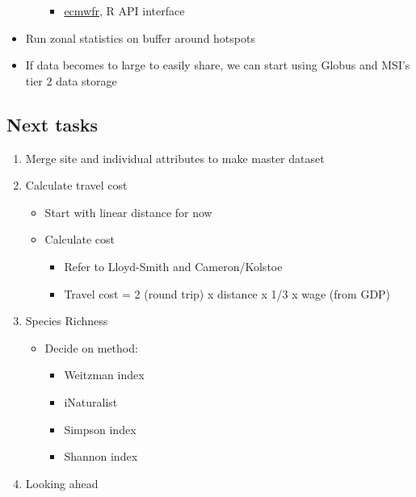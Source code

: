 \documentclass[
  letterpaper,
]{article}
\providecommand{\tightlist}{%
  \setlength{\itemsep}{0pt}\setlength{\parskip}{0pt}}\usepackage{longtable,booktabs,array}
\begin{document}
\begin{tcolorbox}
\begin{itemize}
\begin{itemize}
    \begin{itemize}
    \tightlist
    \item
      \href{https://bluegreen-labs.github.io/ecmwfr/}{ecmwfr}, R API
      interface
    \end{itemize}
  \end{itemize}
\item
  Run zonal statistics on buffer around hotspots
\item
  If data becomes to large to easily share, we can start using Globus
  and MSI's tier 2 data storage
\end{itemize}

\subsection{Next tasks}\label{next-tasks}

\begin{enumerate}
\def\labelenumi{\arabic{enumi}.}
\tightlist
\item
  Merge site and individual attributes to make master dataset
\item
  Calculate travel cost

  \begin{itemize}
  \tightlist
  \item
    Start with linear distance for now
  \item
    Calculate cost

    \begin{itemize}
    \tightlist
    \item
      Refer to Lloyd-Smith and Cameron/Kolstoe
    \item
      Travel cost = 2 (round trip) x distance x 1/3 x wage (from GDP)
    \end{itemize}
  \end{itemize}
\item
  Species Richness

  \begin{itemize}
  \tightlist
  \item
    Decide on method:

    \begin{itemize}
    \tightlist
    \item
      Weitzman index
    \item
      iNaturalist
    \item
      Simpson index
    \item
      Shannon index
    \end{itemize}
  \end{itemize}
\item
  Looking ahead


\end{enumerate}
\end{tcolorbox}
\end{document}
